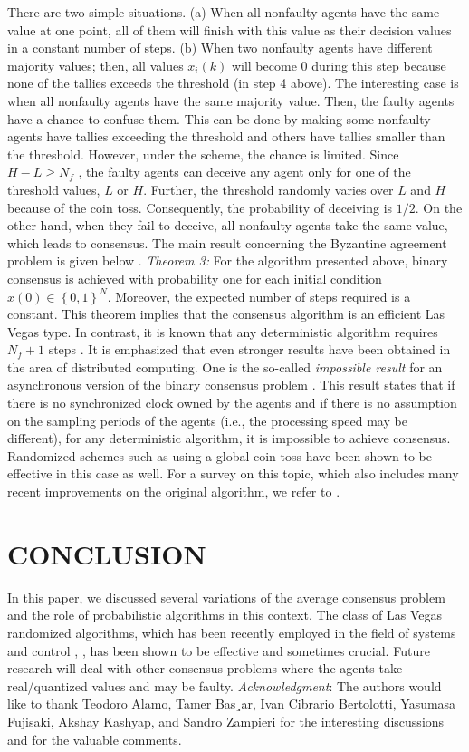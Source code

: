 \documentclass[12pt]{article}
\begin{document}
			There are two simple situations. (a) When all nonfaulty agents have the same value at one point, all of them will finish with this value as their decision values in a constant number of steps. (b) When two nonfaulty agents have different majority values; then, all values $x_{i}(k)$ will become $0$ during this step because none of the tallies exceeds the threshold (in step 4 above).  The interesting case is when all nonfaulty agents have the same majority value. Then, the faulty agents have a chance to confuse them. This can be done by making some nonfaulty agents have tallies exceeding the threshold and others have tallies smaller than the threshold. However, under the scheme, the chance is limited. Since $H−L \ge N_{f}$ , the faulty agents can deceive any agent only for one of the threshold values, $L$ or $H$. Further, the threshold randomly varies over $L$ and $H$ because of the coin toss. Consequently, the probability of deceiving is $1/2$. On the other hand, when they fail to deceive, all nonfaulty agents take the same value, which leads to consensus.  The main result concerning the Byzantine agreement problem is given below \cite{bib17}. \textit{Theorem 3:} For the algorithm presented above, binary consensus is achieved with probability one for each initial condition $x(0) \in \left\{ 0,1 \right\}^{N}$. Moreover, the expected number of steps required is a constant.  This theorem implies that the consensus algorithm is an efficient Las Vegas type. In contrast, it is known that any deterministic algorithm requires $N_{f}+1$ steps \cite{bib17}. It is emphasized that even stronger results have been obtained in the area of distributed computing. One is the so-called \textit{impossible result} for an asynchronous version of the binary consensus problem \cite{bib09}. This result states that if there is no synchronized clock owned by the agents and if there is no assumption on the sampling periods of the agents (i.e., the processing speed may be different), for any deterministic algorithm, it is impossible to achieve consensus. Randomized schemes such as using a global coin toss have been shown to be effective in this case as well. For a survey on this topic, which also includes many recent improvements on the original algorithm, we refer to \cite{bib02}.  
			
		
		\section{CONCLUSION}
		In this paper, we discussed several variations of the average consensus problem and the role of probabilistic algorithms in this context. The class of Las Vegas randomized algorithms, which has been recently employed in the field of systems and control \cite{bib11}, \cite{bib24}, has been shown to be effective and sometimes crucial. Future research will deal with other consensus problems where the agents take real/quantized values and may be faulty.
		\textit{Acknowledgment}: The authors would like to thank Teodoro Alamo, Tamer Bas¸ar, Ivan Cibrario Bertolotti, Yasumasa Fujisaki, Akshay Kashyap, and Sandro Zampieri for the interesting discussions and for the valuable comments.
		
\end{document}
